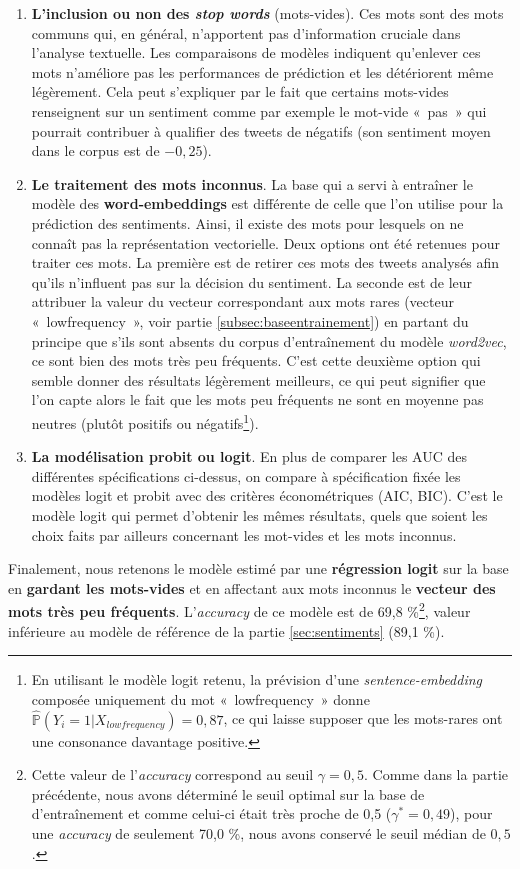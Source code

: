 \documentclass[11pt,french,french]{article}
\let\rmarkdownfootnote\footnote%
\def\footnote{\protect\rmarkdownfootnote}
\begin{document}
\begin{enumerate}
\item \textbf{L’inclusion ou non des \emph{stop words}} (mots-vides). 
Ces mots sont des mots communs qui, en général, n’apportent pas d’information cruciale dans l’analyse textuelle. 
Les comparaisons de modèles indiquent qu’enlever ces mots n’améliore pas les performances de prédiction et les détériorent même légèrement. 
Cela peut s’expliquer par le fait que certains mots-vides renseignent sur un sentiment comme par exemple le mot-vide « pas » qui pourrait contribuer à qualifier des tweets de négatifs (son sentiment moyen dans le corpus est de $-0,25$).

\item \textbf{Le traitement des mots inconnus}. 
La base qui a servi à entraîner le modèle des \textbf{word-embeddings} est différente de celle que l'on utilise pour la prédiction des sentiments.
Ainsi, il existe des mots pour lesquels on ne connaît pas la représentation vectorielle. 
Deux options ont été retenues pour traiter ces mots. 
La première est de retirer ces mots des tweets analysés afin qu'ils n’influent pas sur la décision du sentiment. 
La seconde est de leur attribuer la valeur du vecteur correspondant aux mots rares (vecteur « lowfrequency », voir partie \ref{subsec:baseentrainement}) en partant du principe que s'ils sont absents du corpus d'entraînement du modèle \emph{word2vec}, ce sont bien des mots très peu fréquents. 
C’est cette deuxième option qui semble donner des résultats légèrement meilleurs, ce qui peut signifier que l’on capte alors le fait que les mots peu fréquents ne sont en moyenne pas neutres (plutôt positifs ou négatifs\footnote{En utilisant le modèle logit retenu, la prévision d'une \emph{sentence-embedding} composée uniquement du mot « lowfrequency » donne $\widehat{\mathbb{P}}(Y_i = 1 | X_{lowfrequency}) = 0,87$, ce qui laisse supposer que les mots-rares ont une consonance davantage positive.}). 

\item \textbf{La modélisation probit ou logit}. En plus de comparer les AUC des différentes spécifications ci-dessus,  on compare à spécification fixée les modèles logit et probit avec des critères économétriques (AIC, BIC). C’est le modèle logit qui permet d’obtenir les mêmes résultats, quels que soient les choix faits par ailleurs concernant les mot-vides et les mots inconnus.

\end{enumerate}

Finalement, nous retenons le modèle estimé par une \textbf{régression logit} sur la base en \textbf{gardant les mots-vides} et en affectant aux mots inconnus le \textbf{vecteur des mots très peu fréquents}. L'\emph{accuracy} de ce modèle est de 69,8 \%\footnote{Cette valeur de l'\emph{accuracy} correspond au seuil \(\gamma = 0,5\).
  Comme dans la partie précédente, nous avons déterminé le seuil optimal sur la base de d'entraînement et comme celui-ci était très proche de 0,5 (\(\gamma^* = 0,49\)), pour une \emph{accuracy} de seulement 70,0 \%, nous avons conservé le seuil médian de \(0,5\).}, valeur inférieure au modèle de référence de la partie \ref{sec:sentiments} (89,1 \%).
\end{document}
